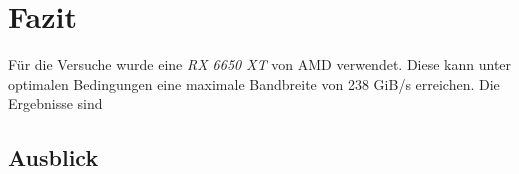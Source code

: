 \section{Fazit}
\label{sec:fazit}
Für die Versuche wurde eine \textit{RX 6650 XT} von AMD verwendet.
Diese kann unter optimalen Bedingungen eine maximale Bandbreite von 238 GiB/s erreichen.
Die Ergebnisse sind 

\subsection{Ausblick}
\label{subsec:ausblick}
